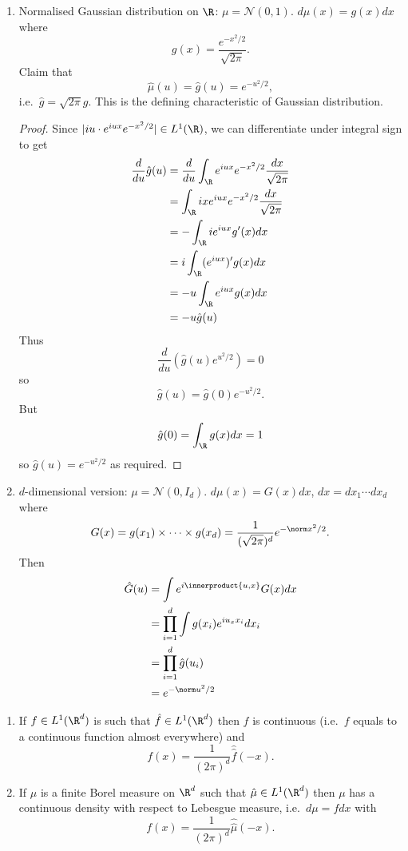 \documentclass[a4paper]{article}
\newcommand*{\ip}{\innerproduct} %
\begin{document}
\begin{eg}\leavevmode
  \begin{enumerate}
  \item Normalised Gaussian distribution on \(\R\): \(\mu = \mathcal N(0, 1)\). \(d\mu(x) = g(x) dx\) where
    \[
      g(x) = \frac{e^{-x^2/2}}{\sqrt{2\pi}}.
    \]
    Claim that
    \[
      \hat \mu (u) = \hat g(u) = e^{-u^2/2},
    \]
    i.e.\ \(\hat g = \sqrt{2\pi} g\). This is the defining characteristic of Gaussian distribution.

    \begin{proof}
      Since \(|iu \cdot e^{iux} e^{-x^2/2}| \in L^1(\R)\), we can differentiate under integral sign to get
      \begin{align*}
        \frac{d}{du} \hat g(u)
        &= \frac{d}{du} \int_\R e^{iux} e^{-x^2/2} \frac{dx}{\sqrt{2\pi}} \\
        &= \int_\R ix e^{iux} e^{-x^2/2} \frac{dx}{\sqrt{2\pi}} \\
        &= -\int_\R i e^{iux} g'(x) dx \\
        &= i \int_\R (e^{iux})' g(x) dx \\
        &= -u \int_\R e^{iux} g(x) dx \\
        &= -u \hat g(u)
      \end{align*}
      Thus
      \[
        \frac{d}{du} (\hat g(u) e^{u^2/2}) = 0
      \]
      so
      \[
        \hat g(u) = \hat g(0) e^{-u^2/2}.
      \]
      But
      \[
        \hat g(0) = \int_\R g(x) dx = 1
      \]
      so \(\hat g(u) = e^{-u^2/2}\) as required.
    \end{proof}
  \item \(d\)-dimensional version: \(\mu = \mathcal N(0, I_d)\). \(d\mu(x) = G(x) dx\), \(dx = dx_1\cdots dx_d\) where
    \[
      G(x) = g(x_1) \times \dots \times g(x_d) = \frac{1}{(\sqrt{2\pi})^d} e^{-\norm x^2/2}.
    \]
    Then
    \begin{align*}
      \hat G(u)
      &= \int e^{i\ip{u, x}} G(x) dx \\
      &= \prod_{i = 1}^d \int g(x_i) e^{iu_x x_i} dx_i \\
      &= \prod_{i = 1}^d \hat g(u_i) \\
      &= e^{-\norm u^2/2}
    \end{align*}
  \end{enumerate}
\end{eg}

\begin{theorem}\leavevmode
  \begin{enumerate}
  \item If \(f \in L^1(\R^d)\) is such that \(\hat f \in L^1(\R^d)\) then \(f\) is continuous (i.e.\ \(f\) equals to a continuous function almost everywhere) and
    \[
      f(x) = \frac{1}{(2\pi)^d} \hat{\hat f} (-x).
    \]
  \item If \(\mu\) is a finite Borel measure on \(\R^d\) such that \(\hat \mu \in L^1(\R^d)\) then \(\mu\) has a continuous density with respect to Lebesgue measure, i.e.\ \(d\mu = f dx\) with
    \[
      f(x) = \frac{1}{(2\pi)^d} \hat{\hat \mu} (-x).
    \]
  \end{enumerate}
\end{theorem}
\end{document}
